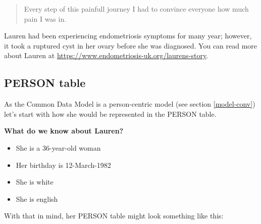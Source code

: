 \documentclass[11pt]{book}
\providecommand{\tightlist}{%
  \setlength{\itemsep}{0pt}\setlength{\parskip}{0pt}}
\theoremstyle{definition}
\theoremstyle{definition}
\theoremstyle{definition}
\theoremstyle{remark}
\begin{document}
\begin{quote}
Every step of this painfull journey I had to convince everyone how much pain I was in.
\end{quote}

Lauren had been experiencing endometriosis symptoms for many year; however, it took a ruptured cyst in her ovary before she was diagnosed. You can read more about Lauren at \url{https://www.endometriosis-uk.org/laurens-story}.

\hypertarget{person}{%
\subsection{PERSON table}\label{person}}

As the Common Data Model is a person-centric model (see section \ref{model-conv}) let's start with how she would be represented in the PERSON table.

\textbf{What do we know about Lauren?}

\begin{itemize}
\tightlist
\item
  She is a 36-year-old woman
\item
  Her birthday is 12-March-1982
\item
  She is white
\item
  She is english
\end{itemize}

With that in mind, her PERSON table might look something like this:
\end{document}

